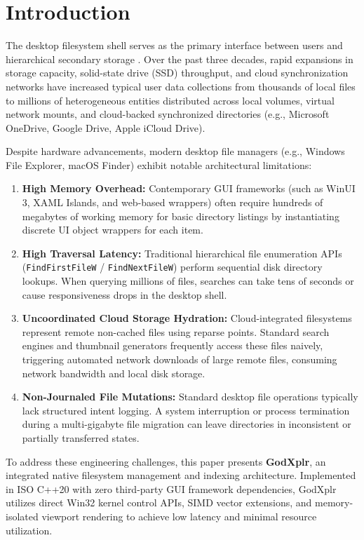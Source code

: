\documentclass[conference]{IEEEtran}
\begin{document}
\section{Introduction}
The desktop filesystem shell serves as the primary interface between users and hierarchical secondary storage \cite{silberschatz_os}. Over the past three decades, rapid expansions in storage capacity, solid-state drive (SSD) throughput, and cloud synchronization networks have increased typical user data collections from thousands of local files to millions of heterogeneous entities distributed across local volumes, virtual network mounts, and cloud-backed synchronized directories (e.g., Microsoft OneDrive, Google Drive, Apple iCloud Drive).

Despite hardware advancements, modern desktop file managers (e.g., Windows File Explorer, macOS Finder) exhibit notable architectural limitations:
\begin{enumerate}
    \item \textbf{High Memory Overhead:} Contemporary GUI frameworks (such as WinUI 3, XAML Islands, and web-based wrappers) often require hundreds of megabytes of working memory for basic directory listings by instantiating discrete UI object wrappers for each item.
    \item \textbf{High Traversal Latency:} Traditional hierarchical file enumeration APIs (\texttt{FindFirstFileW} / \texttt{FindNextFileW}) perform sequential disk directory lookups. When querying millions of files, searches can take tens of seconds or cause responsiveness drops in the desktop shell.
    \item \textbf{Uncoordinated Cloud Storage Hydration:} Cloud-integrated filesystems represent remote non-cached files using reparse points. Standard search engines and thumbnail generators frequently access these files naively, triggering automated network downloads of large remote files, consuming network bandwidth and local disk storage.
    \item \textbf{Non-Journaled File Mutations:} Standard desktop file operations typically lack structured intent logging. A system interruption or process termination during a multi-gigabyte file migration can leave directories in inconsistent or partially transferred states.
\end{enumerate}

To address these engineering challenges, this paper presents \textbf{GodXplr}, an integrated native filesystem management and indexing architecture. Implemented in ISO C++20 with zero third-party GUI framework dependencies, GodXplr utilizes direct Win32 kernel control APIs, SIMD vector extensions, and memory-isolated viewport rendering to achieve low latency and minimal resource utilization.
\end{document}
